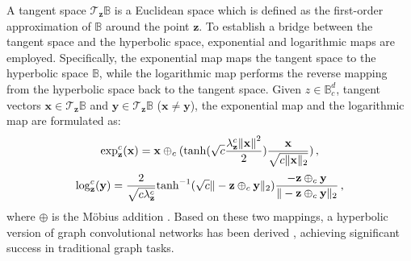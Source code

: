 \documentclass[twoside,leqno,twocolumn]{article}
\begin{document}
A tangent space $\mathcal{T}_\mathbf{z}\mathbb{B}$ is a Euclidean space which is defined as the first-order approximation of $\mathbb{B}$ around the point $\mathbf{z}$. To establish a bridge between the tangent space and the hyperbolic space, exponential and logarithmic maps are employed. Specifically, the exponential map maps the tangent space to the hyperbolic space $\mathbb{B}$, while the logarithmic map performs the reverse mapping from the hyperbolic space back to the tangent space.
Given $z \in \mathbb{B}^d_c$, tangent vectors $\mathbf{x} \in \mathcal{T}_\mathbf{z}\mathbb{B}$ and $\mathbf{y} \in \mathcal{T}_\mathbf{z}\mathbb{B}$ ($\mathbf{x}\neq \mathbf{y}$), the exponential map and the logarithmic map are formulated as:
\begin{equation}
\vspace{-0.3em}
\label{eq1}
    \exp _\mathbf{z}^c(\mathbf{x})=\mathbf{x}\oplus_c(\tanh(\sqrt{c} \frac{\lambda_\mathbf{z}^c {\Vert \mathbf{x} \Vert}^2}{2} )\frac{\mathbf{x}}{\sqrt{c{\Vert \mathbf{x} \Vert_2}}} )
    \,,
\end{equation}
\begin{equation}
\vspace{-0.3em}
\label{eq2}
    \log _\mathbf{z}^c(\mathbf{y})= \frac{2}{\sqrt{c\lambda_\mathbf{z}^c}} {\tanh}^{-1}(\sqrt{c}{\Vert -\mathbf{z}\oplus_c \mathbf{y}\Vert_2}) \frac{-\mathbf{z}\oplus_c \mathbf{y}}{{\Vert-\mathbf{z}\oplus_c \mathbf{y}\Vert_2}} 
    \,,
\end{equation}
where $\oplus$ is the M{\"o}bius addition \cite{ganea2018hyperbolic}. Based on these two mappings, a hyperbolic version of graph convolutional networks has been derived \cite{chami2019hyperbolic}, achieving significant success in traditional graph tasks.
\vspace{-0.8em}
\end{document}
